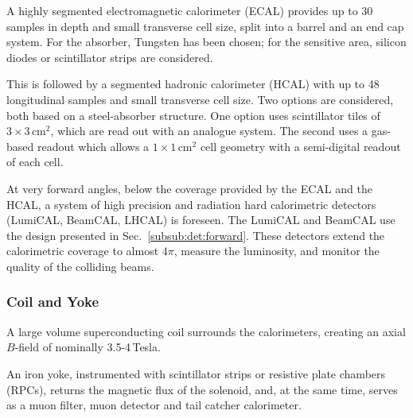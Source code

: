 A highly segmented electromagnetic calorimeter (ECAL) provides up to
30 samples in depth and small transverse cell size, split into a
barrel and an end cap system. For the absorber, Tungsten has been
chosen; for the sensitive area, silicon diodes 
or scintillator strips are considered.



This is followed by a segmented hadronic calorimeter (HCAL) with up to 48 longitudinal samples and small transverse cell size. Two 
options are considered, both based on a steel-absorber structure. One option uses scintillator tiles of $3 \times 3$\,cm$^2$, 
which are read out with an analogue system. The second uses a gas-based readout which allows a $1 \times 1$\,cm$^2$ 
cell geometry with a semi-digital readout of each cell. 

At very forward angles, below the coverage provided by the ECAL and
the HCAL, a system of high precision and radiation hard calorimetric
detectors (LumiCAL, BeamCAL, LHCAL)
 is foreseen. The LumiCAL and BeamCAL use the design presented in
 Sec.~\ref{subsub:det:forward}.    These detectors 
extend the calorimetric coverage to almost $4\pi$, measure the
luminosity, and  monitor
 the quality of the colliding beams.

\subsubsection{Coil and Yoke}
A large volume superconducting coil surrounds the calorimeters, creating an axial $B$-field of nominally 3.5-4\,Tesla.

An iron  yoke, instrumented with scintillator strips or resistive
plate chambers (RPCs), returns the magnetic flux of the solenoid, and,
at the same
 time, serves as a muon filter, muon detector and tail catcher calorimeter.

